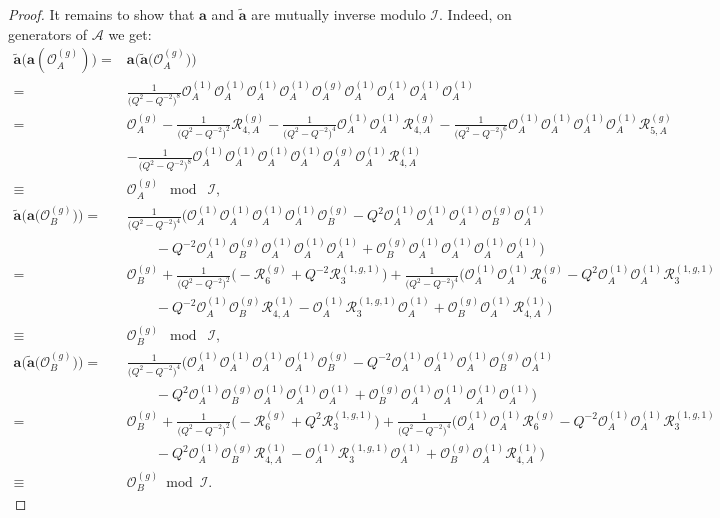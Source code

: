 \documentclass{amsart}
\newcommand{\Oa}{\mathcal O_A}
\newcommand{\Ob}{\mathcal O_B}
\newcommand{\R}{\mathcal R}
\begin{document}
\begin{proof}
It remains to show that $\mathbf a$ and $\widetilde{\mathbf a}$ are mutually inverse modulo $\mathcal I$. Indeed, on generators of $\mathcal A$ we get:
\begin{align*}
\widetilde{\mathbf a}\big(\mathbf a(\Oa^{(g)})\big)=&\mathbf a\big(\widetilde{\mathbf a}\big(\Oa^{(g)}\big)\big)\\
=&\frac1{\big(Q^2-Q^{-2}\big)^8}\Oa^{(1)}\Oa^{(1)}\Oa^{(1)}\Oa^{(1)}\Oa^{(g)}\Oa^{(1)}\Oa^{(1)}\Oa^{(1)}\Oa^{(1)}\\
=&\Oa^{(g)}-\frac1{\big(Q^2-Q^{-2}\big)^2}\R_{4,A}^{(g)}-\frac1{\big(Q^2-Q^{-2}\big)^4}\Oa^{(1)}\Oa^{(1)}\R_{4,A}^{(g)}-\frac1{\big(Q^2-Q^{-2}\big)^6}\Oa^{(1)}\Oa^{(1)}\Oa^{(1)}\Oa^{(1)}\R_{5,A}^{(g)}\\
&-\frac1{\big(Q^2-Q^{-2}\big)^8}\Oa^{(1)}\Oa^{(1)}\Oa^{(1)}\Oa^{(1)}\Oa^{(g)}\Oa^{(1)}\R_{4,A}^{(1)}\\
\equiv&\Oa^{(g)}\;\bmod\;\mathcal I,\\[1.25em]
\widetilde{\mathbf a}\big(\mathbf a\big(\Ob^{(g)}\big)\big)=&\frac1{\big(Q^2-Q^{-2}\big)^4}\Big(\Oa^{(1)}\Oa^{(1)}\Oa^{(1)}\Oa^{(1)}\Ob^{(g)}-Q^2\Oa^{(1)}\Oa^{(1)}\Oa^{(1)}\Ob^{(g)}\Oa^{(1)}\\
&\qquad-Q^{-2}\Oa^{(1)}\Ob^{(g)}\Oa^{(1)}\Oa^{(1)}\Oa^{(1)}+\Ob^{(g)}\Oa^{(1)}\Oa^{(1)}\Oa^{(1)}\Oa^{(1)}\Big)\\
=&\Ob^{(g)}+\frac1{\big(Q^2-Q^{-2}\big)^2}\Big(-\R_{6}^{(g)}+Q^{-2}\R_{3}^{(1,g,1)}\Big)+\frac1{\big(Q^2-Q^{-2}\big)^4}\Big(\Oa^{(1)}\Oa^{(1)}\R_{6}^{(g)}-Q^2\Oa^{(1)}\Oa^{(1)}\R_{3}^{(1,g,1)}\\
&\qquad-Q^{-2}\Oa^{(1)}\Ob^{(g)}\R_{4,A}^{(1)}-\Oa^{(1)}\R_{3}^{(1,g,1)}\Oa^{(1)}+\Ob^{(g)}\Oa^{(1)}\R_{4,A}^{(1)}\Big)\\
\equiv&\Ob^{(g)}\;\bmod\;\mathcal I,\\[1.25em]
\mathbf a\big(\widetilde{\mathbf a}\big(\mathcal O_B^{(g)}\big)\big)=&\frac1{\big(Q^2-Q^{-2}\big)^4}\Big(\Oa^{(1)}\Oa^{(1)}\Oa^{(1)}\Oa^{(1)}\Ob^{(g)}-Q^{-2}\Oa^{(1)}\Oa^{(1)}\Oa^{(1)}\Ob^{(g)}\Oa^{(1)}\\
&\qquad-Q^2\Oa^{(1)}\Ob^{(g)}\Oa^{(1)}\Oa^{(1)}\Oa^{(1)}+\Ob^{(g)}\Oa^{(1)}\Oa^{(1)}\Oa^{(1)}\Oa^{(1)}\Big)\\
=&\Ob^{(g)}+\frac1{\big(Q^2-Q^{-2}\big)^2}\Big(-\R_{6}^{(g)}+Q^2\R_{3}^{(1,g,1)}\Big)+\frac1{\big(Q^2-Q^{-2}\big)^4}\Big(\Oa^{(1)}\Oa^{(1)}\R_{6}^{(g)}-Q^{-2}\Oa^{(1)}\Oa^{(1)}\R_{3}^{(1,g,1)}\\
&\qquad-Q^2\Oa^{(1)}\Ob^{(g)}\R_{4,A}^{(1)}-\Oa^{(1)}\R_{3}^{(1,g,1)}\Oa^{(1)}+\Ob^{(g)}\Oa^{(1)}\R_{4,A}^{(1)}\Big)\\
\equiv&\Ob^{(g)}\bmod\mathcal I.
\end{align*}
\end{proof}
\end{document}
